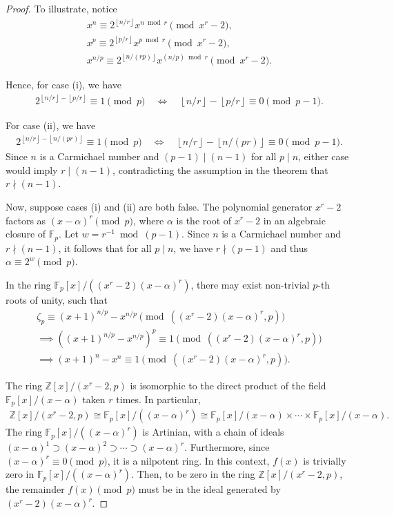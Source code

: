 \documentclass{article}
\theoremstyle{plain}
\theoremstyle{definition}
\newcommand{\floor}[1]{\left\lfloor #1 \right\rfloor}
\newcommand{\Z}{\mathbb{Z}}
\begin{document}
\begin{proof}
To illustrate, notice
\begin{align*}
    x^n \equiv 2^{\floor{n/r}} x^{n \bmod r} \pmod{x^r-2} , \\
    x^p \equiv 2^{\floor{p/r}} x^{p \bmod r} \pmod{x^r-2} , \\
    x^{n/p} \equiv 2^{\floor{n/(rp)}} x^{(n/p) \bmod r} \pmod{x^r-2} .
\end{align*}

Hence, for case (i), we have
\begin{align*}
    2^{\floor{n/r} - \floor{p/r}} \equiv 1 \pmod{p} 
    \quad \Longleftrightarrow \quad
    \floor{n/r} - \floor{p/r} \equiv 0 \pmod{p-1} .
\end{align*}

For case (ii), we have
\begin{align*}
    2^{\floor{n/r} - \floor{n/(pr)}} \equiv 1 \pmod{p} 
    \quad \Longleftrightarrow \quad
    \floor{n/r} - \floor{n/(pr)} \equiv 0 \pmod{p-1} .
\end{align*}
Since $n$ is a Carmichael number and $(p-1) \mid (n-1)$ for all $p \mid n$, either case would imply $r \mid (n-1)$, contradicting the assumption in the theorem that $r \nmid (n-1)$.

Now, suppose cases (i) and (ii) are both false. The polynomial generator $x^r-2$ factors as $(x-\alpha)^r \pmod{p}$, where $\alpha$ is the root of $x^r-2$ in an algebraic closure of $\mathbb{F}_p$. Let $w = r^{-1} \bmod (p-1)$. Since $n$ is a Carmichael number and $r \nmid (n-1)$, it follows that for all $p \mid n$, we have $r \nmid (p-1)$ and thus $\alpha \equiv 2^w \pmod{p}$.

In the ring $\mathbb{F}_p[x]/((x^r-2)(x-\alpha)^r)$, there may exist non-trivial $p$-th roots of unity, such that
\begin{align*}
    \zeta_p \equiv (x+1)^{n/p} - x^{n/p} \pmod{((x^r-2)(x-\alpha)^r, p)} \\
    \implies
    \left( (x+1)^{n/p} - x^{n/p} \right)^p \equiv 1 \pmod{((x^r-2)(x-\alpha)^r, p)} \\
    \implies
    (x+1)^n - x^n \equiv 1 \pmod{((x^r-2)(x-\alpha)^r, p)} .
\end{align*}

The ring $\Z[x]/(x^r-2, p)$ is isomorphic to the direct product of the field $\mathbb{F}_p[x]/(x-\alpha)$ taken $r$ times. In particular,
\begin{align*}
 \Z[x]/(x^r-2, p) \cong \mathbb{F}_p[x]/((x-\alpha)^r) \cong \mathbb{F}_p[x]/(x-\alpha) \times \cdots \times \mathbb{F}_p[x]/(x-\alpha) .
\end{align*}
The ring $\mathbb{F}_p[x]/((x-\alpha)^r)$ is Artinian, with a chain of ideals $(x-\alpha)^1 \supset (x-\alpha)^2 \supset \cdots \supset (x-\alpha)^r$. Furthermore, since $(x-\alpha)^r \equiv 0 \pmod{p}$, it is a nilpotent ring. In this context, $f(x)$ is trivially zero in $\mathbb{F}_p[x]/((x-\alpha)^r)$. Then, to be zero in the ring $\Z[x]/(x^r-2, p)$, the remainder $f(x) \pmod{p}$ must be in the ideal generated by $(x^r-2)(x-\alpha)^r$.


\end{proof}
\end{document}
